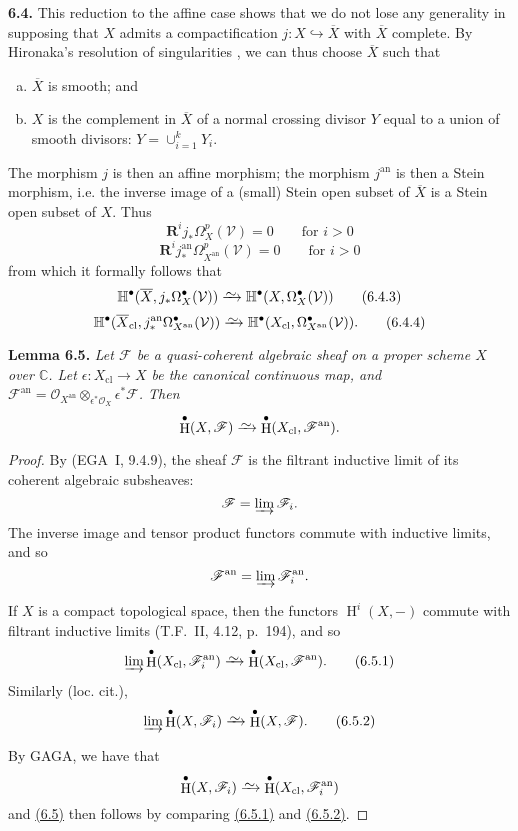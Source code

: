 \documentclass{report}
\newenvironment{itenv}[1]
  {\phantomsection\par\medskip\noindent\textbf{#1.}\itshape}
  {\par\medskip}
\newenvironment{rmenv}[1]
  {\phantomsection\par\medskip\noindent\textbf{#1.}\rmfamily}
  {\par\medskip}
\newcommand{\scr}[1]{{\mathscr{#1}}}
\renewcommand{\cal}[1]{{\mathcal{#1}}}
\newcommand{\CC}{\mathbb{C}}
\newcommand{\RR}{\mathbf{R}}
\newcommand{\an}{\mathrm{an}}
\newcommand{\cl}{\mathrm{cl}}
\newcommand{\simto}{\xrightarrow{\raisebox{-0.7ex}[0ex][0ex]{$\sim$}}}
\DeclareMathOperator{\HH}{H}
\newcommand{\oldpage}[1]{\marginpar{\footnotesize$\Big\vert$ \textit{p.~#1}}}
\begin{document}
\begin{rmenv}{6.4}
\label{II.6.4}
  This reduction to the affine case shows that we do not lose any generality in supposing that $X$ admits a compactification $j\colon X\hookrightarrow\overline{X}$ with $\overline{X}$ complete.
  By Hironaka's resolution of singularities \cite{12}, we can thus choose $\overline{X}$ such that
  \begin{enumerate}[a)]
    \item $\overline{X}$ is smooth; and
    \item $X$ is the complement in $\overline{X}$ of a normal crossing divisor $Y$ equal to a union of smooth divisors: $Y=\cup_{i=1}^k Y_i$.
  \end{enumerate}

  The morphism $j$ is then an affine morphism;
  the morphism $j^\an$ is then a Stein morphism, i.e. the inverse image of a (small) Stein open subset of $\overline{X}$ is a Stein open subset of $X$.
  Thus
  \[
  \label{II.6.4.1}
    \RR^i j_*\Omega_X^p(\cal{V}) = 0
    \qquad\mbox{for $i>0$}
  \tag{6.4.1}
  \]
\oldpage{100}
  \[
  \label{II.6.4.2}
    \RR^i j_*^\an\Omega_{X^\an}^p(\cal{V}) = 0
    \qquad\mbox{for $i>0$}
  \tag{6.4.2}
  \]
  from which it formally follows that
  \[
  \label{II.6.4.3}
    \mathbb{H}^\bullet(\overline{X},j_*\Omega_X^\bullet(\cal{V}))
    \simto \mathbb{H}^\bullet(X,\Omega_X^\bullet(\cal{V}))
  \tag{6.4.3}
  \]
  \[
  \label{II.6.4.4}
    \mathbb{H}^\bullet(\overline{X}_\cl,j_*^\an\Omega_{X^\an}^\bullet(\cal{V}))
    \simto \mathbb{H}^\bullet(X_\cl,\Omega_{X^\an}^\bullet(\cal{V})).
  \tag{6.4.4}
  \]
\end{rmenv}

\begin{itenv}{Lemma 6.5}
\label{II.6.5}
  Let $\scr{F}$ be a \emph{quasi-coherent} algebraic sheaf on a proper scheme $X$ over $\CC$.
  Let $\epsilon\colon X_\cl\to X$ be the canonical continuous map, and $\scr{F}^\an=\cal{O}_{X^\an}\otimes_{\epsilon^*\cal{O}_X}\epsilon^*\scr{F}$.
  Then
  \[
    \HH^\bullet(X,\scr{F}) \simto \HH^\bullet(X_\cl,\scr{F}^\an).
  \]
\end{itenv}

\begin{proof}
  By (EGA~I, 9.4.9), the sheaf $\scr{F}$ is the filtrant inductive limit of its coherent algebraic subsheaves:
  \[
    \scr{F} = \varinjlim\scr{F}_i.
  \]
  The inverse image and tensor product functors commute with inductive limits, and so
  \[
    \scr{F}^\an = \varinjlim\scr{F}_i^\an.
  \]

  If $X$ is a compact topological space, then the functors $\HH^i(X,-)$ commute with filtrant inductive limits (T.F.~II, 4.12, p.~194), and so
  \[
  \label{II.6.5.1}
    \varinjlim\HH^\bullet(X_\cl,\scr{F}_i^\an) \simto \HH^\bullet(X_\cl,\scr{F}^\an).
  \tag{6.5.1}
  \]
  Similarly (loc. cit.),
  \[
  \label{II.6.5.2}
    \varinjlim\HH^\bullet(X,\scr{F}_i) \simto \HH^\bullet(X,\scr{F}).
  \tag{6.5.2}
  \]

  By GAGA, we have that
  \[
    \HH^\bullet(X,\scr{F}_i) \simto \HH^\bullet(X_\cl,\scr{F}_i^\an)
  \]
  and \hyperref[II.6.5]{(6.5)} then follows by comparing \hyperref[II.6.5.1]{(6.5.1)} and \hyperref[II.6.5.2]{(6.5.2)}.
\end{proof}
\end{document}
